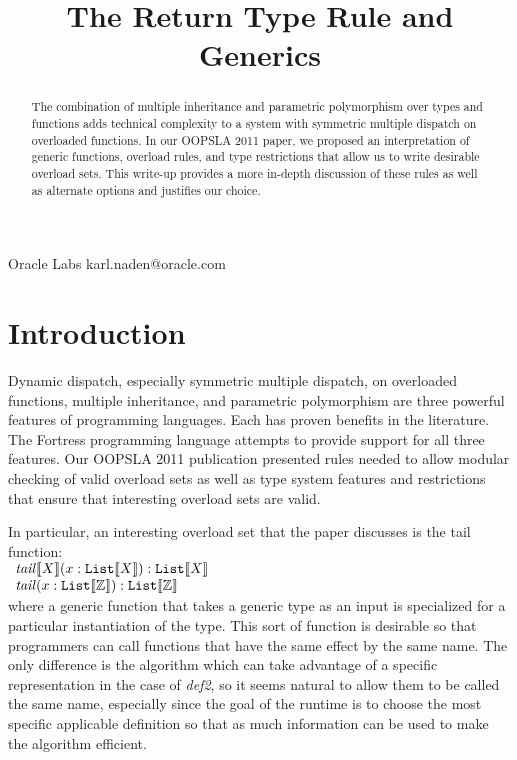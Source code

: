 \documentclass[preprint]{sigplanconf}
\newcommand{\ob}[1]{\ensuremath{\llbracket {#1} \rrbracket}}
\begin{document}
\title{The Return Type Rule and Generics}

           {Oracle Labs}
           {karl.naden@oracle.com}

\maketitle

\begin{abstract}

The combination of multiple inheritance and parametric polymorphism over types and functions
adds technical complexity to a system with symmetric multiple dispatch on overloaded functions.
In our OOPSLA 2011 paper, we proposed an interpretation of generic functions, overload 
rules, and type restrictions that allow us to write desirable overload sets.  This write-up provides
a more in-depth discussion of these rules as well as alternate options and justifies our choice.

\end{abstract}

\section{Introduction}

Dynamic dispatch, especially symmetric multiple dispatch, on overloaded functions, multiple inheritance,
and parametric polymorphism are three powerful features of programming languages.  Each has
proven benefits in the literature.  The Fortress programming language attempts to provide support
for all three features.  Our OOPSLA 2011 publication presented rules needed to allow modular checking
of valid overload sets as well as type system features and restrictions that ensure that interesting
overload sets are valid.

In particular, an interesting overload set that the paper discusses is the tail function:\\

$\begin{array}{l}
{\it tail}\ob{X}(x : {\tt List}\ob{X}) : {\tt List}\ob{X} \\
{\it tail}(x : {\tt List}\ob{\mathbb{Z}}) : {\tt List}\ob{\mathbb{Z}}
\end{array}$\\

\noindent where a generic function that takes a generic type as an input is specialized for a particular instantiation
of the type.  This sort of function is desirable so that programmers can call functions that have the same effect by
the same name.  The only difference is the algorithm which can take advantage of a specific representation
in the case of {\it def2}, so it seems natural to allow them to be called the same name, especially since the
goal of the runtime is to choose the most specific applicable definition so that as much information can
be used to make the algorithm efficient.
\end{document}
